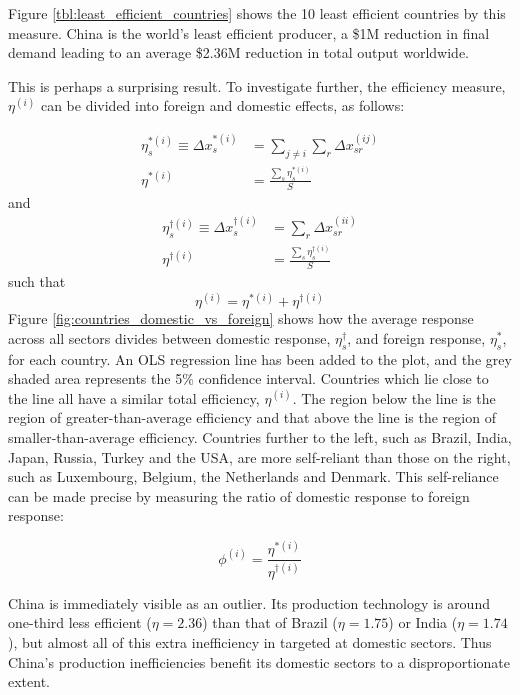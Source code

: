 \documentclass[a4paper]{article}
\begin{document}
Figure \ref{tbl:least_efficient_countries} shows the 10 least efficient countries by this measure.
China is the world's least efficient producer, a \$1M reduction in final demand leading to an average \$2.36M reduction in total output worldwide.
 
This is perhaps a surprising result.
To investigate further, the efficiency measure, $\eta^{(i)}$ can be divided into foreign and domestic effects, as follows:

\begin{align}
\eta_s^{*(i)} \equiv \Delta x_{s}^{*(i)} & = 
	\sum_{j \neq i} \sum_r \Delta x_{sr}^{(ij)} \\
\eta^{*(i)} & = 
	\frac{\sum_s \eta_s^{*(i)}}{S}
\end{align}
and
\begin{align}
\eta_s^{\dagger(i)} \equiv \Delta x_{s}^{\dagger(i)} & = 
	\sum_r \Delta x_{sr}^{(ii)} \\
\eta^{\dagger(i)} & = 
	\frac{\sum_s \eta_s^{\dagger(i)}}{S}
\end{align}
such that
\begin{equation}
\eta^{(i)} = \eta^{*(i)} + \eta^{\dagger(i)}
\end{equation}
Figure \ref{fig:countries_domestic_vs_foreign} shows how the average response across all sectors divides between domestic response, $\eta_s^{\dagger}$, and foreign response, $\eta_s^{*}$, for each country. 
An OLS regression line has been added to the plot, and the grey shaded area represents the 5\% confidence interval.
Countries which lie close to the line all have a similar total efficiency, $\eta^{(i)}$.
The region below the line is the region of greater-than-average efficiency and that above the line is the region of smaller-than-average efficiency.
Countries further to the left, such as Brazil, India, Japan, Russia, Turkey and the USA, are more self-reliant than those on the right, such as Luxembourg, Belgium, the Netherlands and Denmark.
This self-reliance can be made precise by measuring the ratio of domestic response to foreign response:

\begin{equation}
\phi^{(i)} = \frac{\eta^{*(i)}}{\eta^{\dagger(i)}}
\end{equation}

China is immediately visible as an outlier.
Its production technology is around one-third less efficient ($\eta = 2.36$) than that of Brazil ($\eta = 1.75$) or India ($\eta = 1.74$), but almost all of this extra inefficiency in targeted at domestic sectors.
Thus China's production inefficiencies benefit its domestic sectors to a disproportionate extent.
\end{document}
